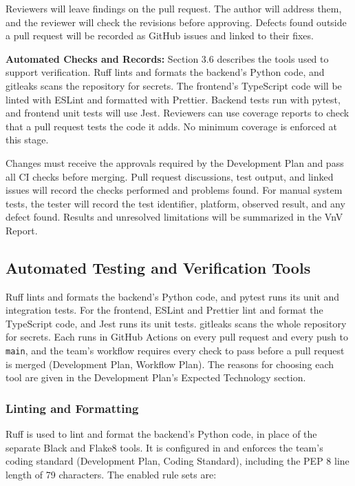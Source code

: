 \documentclass[12pt, titlepage]{article}
\begin{document}
\noindent
Reviewers will leave findings on the pull request. The author will address them, and the reviewer will check the revisions before approving. Defects found outside a pull request will be recorded as GitHub issues and linked to their fixes.

\bigskip
\noindent
\textbf{Automated Checks and Records:} Section 3.6 describes the tools used to support verification. Ruff lints and formats the backend's Python code, and gitleaks scans the repository for secrets. The frontend's TypeScript code will be linted with ESLint and formatted with Prettier. Backend tests run with pytest, and frontend unit tests will use Jest. Reviewers can use coverage reports to check that a pull request tests the code it adds. No minimum coverage is enforced at this stage.

\medskip
\noindent
Changes must receive the approvals required by the Development Plan and pass all CI checks before merging. Pull request discussions, test output, and linked issues will record the checks performed and problems found. For manual system tests, the tester will record the test identifier, platform, observed result, and any defect found. Results and unresolved limitations will be summarized in the VnV Report.



\subsection{Automated Testing and Verification Tools}

Ruff lints and formats the backend's Python code, and pytest runs its unit and
integration tests. For the frontend, ESLint and Prettier lint and format the
TypeScript code, and Jest runs its unit tests. gitleaks scans the whole
repository for secrets. Each runs in GitHub Actions on every pull request and
every push to \texttt{main}, and the team's workflow requires every check to
pass before a pull request is merged (Development Plan, Workflow Plan). The
reasons for choosing each tool are given in the Development Plan's Expected
Technology section.

\subsubsection{Linting and Formatting}

Ruff is used to lint and format the backend's Python code, in place of the
separate Black and Flake8 tools. It is configured in
 and enforces the team's coding standard
(Development Plan, Coding Standard), including the PEP 8 line length of 79
characters. The enabled rule sets are:
\end{document}
